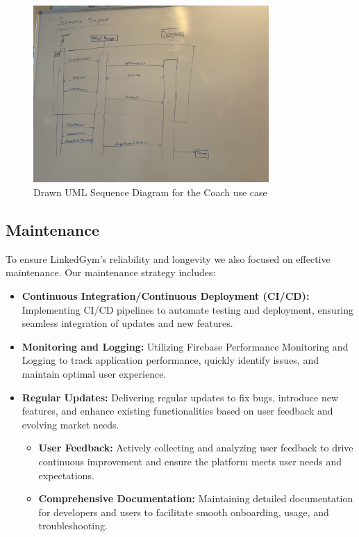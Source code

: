 \begin{figure}[H]
    \centering
    \includegraphics[width=0.8\textwidth]{images/coach_sequence_diagram.jpg}
    \caption{ Drawn UML Sequence Diagram for the Coach use case }
    \label{fig:sequence}
\end{figure}



\subsection{Maintenance}
To ensure LinkedGym's reliability and longevity we also focused on effective maintenance. Our maintenance strategy includes:

\begin{itemize}
  \item \textbf{Continuous Integration/Continuous Deployment (CI/CD):} Implementing CI/CD pipelines to automate testing and deployment, ensuring seamless integration of updates and new features.
  
  \item \textbf{Monitoring and Logging:} Utilizing Firebase Performance Monitoring and Logging to track application performance, quickly identify issues, and maintain optimal user experience.
  
  \item \textbf{Regular Updates:} Delivering regular updates to fix bugs, introduce new features, and enhance existing functionalities based on user feedback and evolving market needs.

\begin{itemize}
\item \textbf{User Feedback:} Actively collecting and analyzing user feedback to drive continuous improvement and ensure the platform meets user needs and expectations.

\item \textbf{Comprehensive Documentation:} Maintaining detailed documentation for developers and users to facilitate smooth onboarding, usage, and troubleshooting.
\end{itemize}
\end{itemize}


